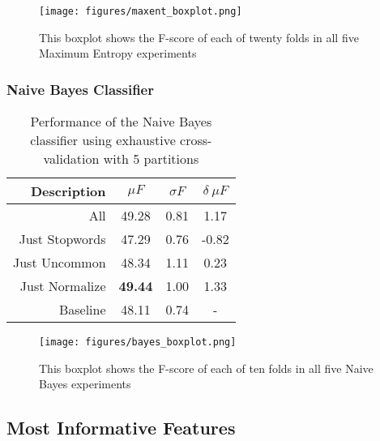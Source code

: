 \documentclass[final,3p,12pt]{elsarticle}
\begin{document}
\begin{figure}[H]
    \begin{center}
    \texttt{[image: figures/maxent\_boxplot.png]}
    \caption{This boxplot shows the F-score of each of twenty folds in all five
    Maximum Entropy experiments}
    \label{figure:maxent}
    \end{center}
\end{figure}


\subsubsection{Naive Bayes Classifier}

\begin{table}[H]
    \begin{center}
    \begin{tabular}{|r||c|c|c|}
        \hline
        Description    & $\mu F$ & $\sigma F$ & $\delta\ \mu F$ \\
        \hline
        All            & 49.28  & 0.81 &  1.17 \\
        Just Stopwords & 47.29  & 0.76 & -0.82 \\
        Just Uncommon  & 48.34  & 1.11 &  0.23 \\
        Just Normalize & \textbf{49.44} & 1.00 & 1.33\\
        Baseline       & 48.11  & 0.74 & - \\
        \hline
    \end{tabular}
    \end{center}
    \caption{Performance of the Naive Bayes classifier using exhaustive
    cross-validation with 5 partitions}
    \label{table:bayes-results}
\end{table}

\begin{figure}[H]
    \begin{center}
    \texttt{[image: figures/bayes\_boxplot.png]}
    \caption{This boxplot shows the F-score of each of ten folds in all five
    Naive Bayes experiments}
    \label{figure:bayes}
    \end{center}
\end{figure}


\subsection{Most Informative Features}
\label{ssection:informativefeatures}
\end{document}
